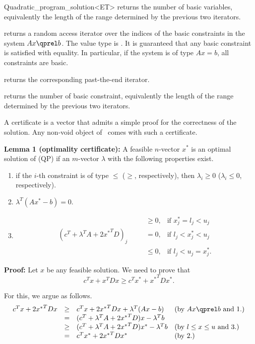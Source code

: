 \begin{ccRefClass}{Quadratic_program_solution<ET>}
{returns the number of basic variables, equivalently the length
of the range determined by the previous two iterators.}

{returns a random access iterator over the indices of the basic
constraints in the system $Ax\qprel b$. The value type is . 
It is guaranteed that any basic constraint is satisfied with equality.
In particular, if the system is of type $Ax=b$, all constraints are
basic.}

{returns the corresponding past-the-end iterator.}

{returns the number of basic constraint, equivalently the length
of the range determined by the previous two iterators.}


A certificate is a vector that admits a simple proof for the 
correctness of the solution. Any non-void object of \ccRefName\ 
comes with such a certificate.

{\bf Lemma 1 (optimality certificate):} A feasible $n$-vector $x^*$ 
is an optimal solution of (QP) if an $m$-vector $\lambda$ with the
following properties exist.
\begin{enumerate}
\item if the $i$-th constraint is of type $\leq$ ($\geq$, respectively), 
then $\lambda_i\geq 0$ ($\lambda_i\leq 0$, respectively).
\item $\lambda^T(Ax^*-b) = 0$.
\item \[
\begin{array}{llll}
&&\geq 0, & \mbox{if $x^*_j = l_j < u_j$} \\
(c^T + \lambda^T A + 2{x^*}^TD)_j& \quad  &= 0, & \mbox{if $l_j < x^*_j < u_j$} \\
&&\leq 0, & \mbox{if $l_j < u_j = x^*_j$.}
\end{array}\]
\end{enumerate}

\begin{ccAdvanced}
{\bf Proof:} Let $x$ be any feasible solution. We need to prove that
\[c^Tx + x^TDx \geq c^Tx^* + {x^*}^TDx^*.\]

For this, we argue as follows.
\[
\begin{array}{lcll}
c^Tx + 2{x^*}^TDx &\geq& c^Tx + 2{x^*}^TDx + \lambda^T(Ax-b) &  
\mbox{(by $Ax\qprel b$ and 1.)} \\
                  &=& (c^T + \lambda^T A + 2{x^*}^TD)x - \lambda^Tb \\
                  &\geq& (c^T + \lambda^T A + 2{x^*}^TD)x^* - \lambda^Tb &
\mbox{(by $l\leq x \leq u$ and 3.)} \\
                  &=& c^Tx^* + 2{x^*}^TDx^* &
\mbox{(by 2.)}
\end{array}
\]


\end{ccAdvanced}
\end{ccRefClass}

